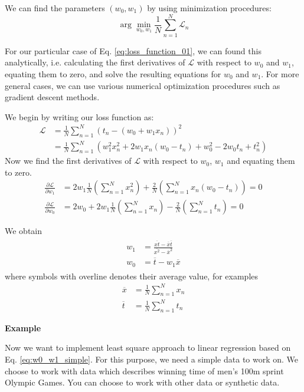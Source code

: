 We can find the parameters $(w_{0},w_{1})$ by using minimization procedures:
\begin{equation}
\arg\min_{w_{0},w_{1}} \frac{1}{N} \sum_{n=1}^{N} \mathcal{L}_{n}
\end{equation}

For our particular case of Eq. \eqref{eq:loss_function_01}, we can found this analytically,
i.e. calculating the first derivatives of $\mathcal{L}$ with
respect to $w_0$ and $w_1$, equating
them to zero, and solve the resulting equations for $w_0$ and $w_1$.
For more general cases, we can use various numerical optimization procedures such as
gradient descent methods.

We begin by writing our loss function as:
\begin{align*}
\mathcal{L} & = \frac{1}{N} \sum_{n=1}^{N} \left( t_n - (w_0 + w_1 x_{n}) \right)^2 \\
& = \frac{1}{N} \sum_{n=1}^{N} \left( w_1^2 x_n^2 + 2w_{1}x_{n}(w_0 - t_n) + w_0^2 - 2w_0 t_n + t_n^2 \right)
\end{align*}
%
Now we find the first derivatives of $\mathcal{L}$ with respect to
$w_0$, $w_1$ and equating them to zero.
\begin{align*}
\frac{\partial\mathcal{L}}{\partial w_1} & = 2w_1 \frac{1}{N} \left( \sum_{n=1}^{N} x_n^2 \right) +
\frac{2}{N} \left( \sum_{n=1}^{N} x_{n} (w_0 - t_n) \right) = 0 \\
\frac{\partial \mathcal{L}}{\partial w_0} & = 2w_0 + 2w_1 \frac{1}{N} \left( \sum_{n=1}^{N} x_n \right) -
\frac{2}{N} \left( \sum_{n=1}^{N} t_n \right) = 0
\end{align*}

We obtain
\begin{align}
\begin{split}
w_{1} & = \frac{\overline{xt} - \overline{x}\overline{t}}{\overline{x^2} - \overline{x}^2} \\
w_{0} & = \overline{t} - w_{1} \overline{x}
\end{split}
\label{eq:w0_w1_simple}
\end{align}
where symbols with overline denotes their average value, for examples
\begin{align*}
\overline{x} & = \frac{1}{N} \sum_{n=1}^{N} x_{n} \\
\overline{t} & = \frac{1}{N} \sum_{n=1}^{N} t_{n}
\end{align*}

\textbf{Example}

Now we want to implement least square approach to linear regression based on
Eq. \ref{eq:w0_w1_simple}. For this purpose, we need a simple data to work on.
We choose to work with  data which describes 
winning time of men's 100m sprint Olympic Games. You can choose to work with other
data or synthetic data.

